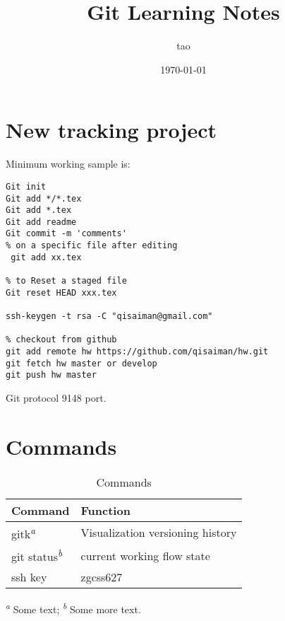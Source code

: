 \documentclass[12pt,letterpaper]{article}
\title{Git Learning Notes}
\author{tao}
\date{\today}
\begin{document}
\maketitle
\section{New tracking project}
Minimum working sample is:
\begin{lstlisting}
Git init
Git add */*.tex
Git add *.tex
Git add readme
Git commit -m 'comments'
% on a specific file after editing
 git add xx.tex

% to Reset a staged file
Git reset HEAD xxx.tex

ssh-keygen -t rsa -C "qisaiman@gmail.com"

% checkout from github 
git add remote hw https://github.com/qisaiman/hw.git
git fetch hw master or develop 
git push hw master
\end{lstlisting}

Git protocol 9148 port. 

\section{Commands}

\begin{table}
  \caption{Commands}
  \label{tbl:notes}
  \begin{tabular}{ll}
    \toprule
    Command                            & Function \\
    \midrule
    gitk\textsuperscript{\emph{a}}   & Visualization versioning history  \\
    git status\textsuperscript{\emph{b}} & current working flow state \\
    ssh key   & zgcss627\\
    
    \bottomrule
  \end{tabular}

  \textsuperscript{\emph{a}} Some text;
  \textsuperscript{\emph{b}} Some more text.
\end{table}
\end{document}
